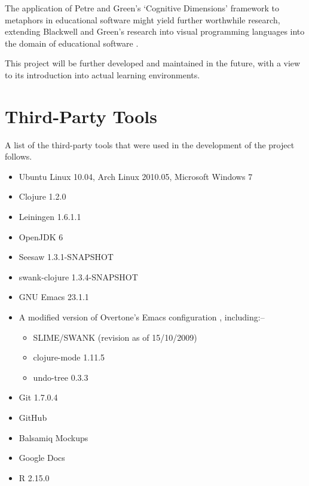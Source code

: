 \documentclass[12pt,twoside,notitlepage,xetex]{report}
\begin{document}
The application of Petre and Green's `Cognitive Dimensions' framework to metaphors in educational software might yield further worthwhile research, extending Blackwell and Green's research into visual programming languages into the domain of educational software \cite{Green1996} \cite{Blackwell1999}.

This project will be further developed and maintained in the future, with a view to its introduction into actual learning environments.




\cleardoublepage



\cleardoublepage

\appendix

\chapter{Third-Party Tools}

A list of the third-party tools that were used in the development of the project follows.

\begin{itemize}
\item Ubuntu Linux 10.04, Arch Linux 2010.05, Microsoft Windows 7
\item Clojure 1.2.0
\item Leiningen 1.6.1.1
\item OpenJDK 6
\item Seesaw 1.3.1-SNAPSHOT
\item swank-clojure 1.3.4-SNAPSHOT
\item GNU Emacs 23.1.1
\item A modified version of Overtone's Emacs configuration \cite{OvertoneEmacsD}, including:--
\begin{itemize}
\item SLIME/SWANK (revision as of 15/10/2009)
\item clojure-mode 1.11.5
\item undo-tree 0.3.3
\end{itemize}
\item Git 1.7.0.4
\item GitHub
\item Balsamiq Mockups
\item Google Docs
\item R 2.15.0
\end{itemize}
\end{document}
